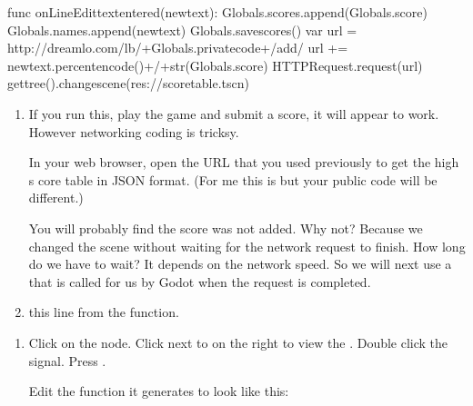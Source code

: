 \documentclass[a4paper,12pt,english]{sphinxmanual}
\begin{document}
\begin{sphinxVerbatim}[commandchars=\\\{\}]
func \PYGZus{}on\PYGZus{}LineEdit\PYGZus{}text\PYGZus{}entered(new\PYGZus{}text):
    Globals.scores.append(Globals.score)
    Globals.names.append(new\PYGZus{}text)
    Globals.save\PYGZus{}scores()
    var url = \PYGZdq{}http://dreamlo.com/lb/\PYGZdq{}+Globals.private\PYGZus{}code+\PYGZdq{}/add/\PYGZdq{}
    url += new\PYGZus{}text.percent\PYGZus{}encode()+\PYGZdq{}/\PYGZdq{}+str(Globals.score)
    \PYGZdl{}HTTPRequest.request(url)
    get\PYGZus{}tree().change\PYGZus{}scene(\PYGZdq{}res://score\PYGZus{}table.tscn\PYGZdq{})
\end{sphinxVerbatim}
\begin{enumerate}
%
\setcounter{enumi}{2}
\item {} 
\sphinxAtStartPar
If you run this, play the game and submit a score, it will appear to
work. However networking coding is tricksy.

\sphinxAtStartPar
In your web browser, open the URL that you used previously to get the
high s core table in JSON format. (For me this is
 but your public
code will be different.)

\sphinxAtStartPar
You will probably find the score was not added. Why not? Because we
changed the scene without waiting for the network request to finish.
How long do we have to wait? It depends on the network speed. So we
will next use a  that is called for us by Godot
when the request is completed.

\item {} 
\sphinxAtStartPar
{} this line from the  function.

\end{enumerate}

\begin{sphinxVerbatim}[commandchars=\\\{\}]
\end{sphinxVerbatim}
\begin{enumerate}
%
\setcounter{enumi}{4}
\item {} 
\sphinxAtStartPar
Click on the  node. Click  next to 
on the right to view the . Double click the
 signal. Press .

\sphinxAtStartPar
Edit the function it generates to look like this:

\end{enumerate}
\end{document}
